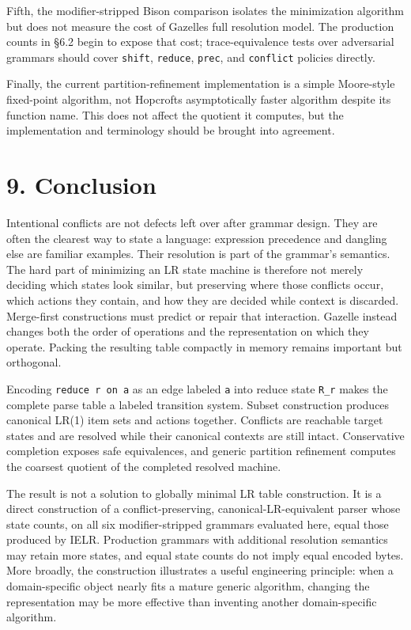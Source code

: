 \documentclass[
  10pt,
]{article}
\begin{document}
Fifth, the modifier-stripped Bison comparison isolates the minimization
algorithm but does not measure the cost of Gazelle\textquotesingle s
full resolution model. The production counts in §6.2 begin to expose
that cost; trace-equivalence tests over adversarial grammars should
cover \texttt{shift}, \texttt{reduce}, \texttt{prec}, and
\texttt{conflict} policies directly.

Finally, the current partition-refinement implementation is a simple
Moore-style fixed-point algorithm, not Hopcroft\textquotesingle s
asymptotically faster algorithm despite its function name. This does not
affect the quotient it computes, but the implementation and terminology
should be brought into agreement.

\hypertarget{9-conclusion}{%
\section{9. Conclusion}\label{9-conclusion}}

Intentional conflicts are not defects left over after grammar design.
They are often the clearest way to state a language: expression
precedence and dangling else are familiar examples. Their resolution is
part of the grammar's semantics. The hard part of minimizing an LR state
machine is therefore not merely deciding which states look similar, but
preserving where those conflicts occur, which actions they contain, and
how they are decided while context is discarded. Merge-first
constructions must predict or repair that interaction. Gazelle instead
changes both the order of operations and the representation on which
they operate. Packing the resulting table compactly in memory remains
important but orthogonal.

Encoding \texttt{reduce\ r\ on\ a} as an edge labeled \texttt{a} into
reduce state \texttt{R\_r} makes the complete parse table a labeled
transition system. Subset construction produces canonical LR(1) item
sets and actions together. Conflicts are reachable target states and are
resolved while their canonical contexts are still intact. Conservative
completion exposes safe equivalences, and generic partition refinement
computes the coarsest quotient of the completed resolved machine.

The result is not a solution to globally minimal LR table construction.
It is a direct construction of a conflict-preserving,
canonical-LR-equivalent parser whose state counts, on all six
modifier-stripped grammars evaluated here, equal those produced by IELR.
Production grammars with additional resolution semantics may retain more
states, and equal state counts do not imply equal encoded bytes. More
broadly, the construction illustrates a useful engineering principle:
when a domain-specific object nearly fits a mature generic algorithm,
changing the representation may be more effective than inventing
another domain-specific algorithm.
\end{document}
